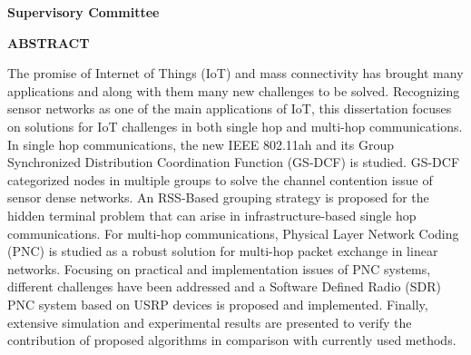 \newpage
{}

\noindent \textbf{Supervisory Committee}
\tpbreak
\panel

\begin{center}
\textbf{ABSTRACT}
\end{center}

The promise of Internet of Things (IoT) and mass connectivity has brought many applications and along with them many new challenges to be solved. Recognizing sensor networks as one of the main applications of IoT, this dissertation focuses on solutions for IoT challenges in both single hop and multi-hop communications. In single hop communications, the new IEEE 802.11ah and its Group Synchronized Distribution Coordination Function (GS-DCF) is studied. GS-DCF categorized nodes in multiple groups to solve the channel contention issue of sensor dense networks. An RSS-Based grouping strategy is proposed for the hidden terminal problem that can arise in infrastructure-based single hop communications. For multi-hop communications, Physical Layer Network Coding (PNC) is studied as a robust solution for multi-hop packet exchange in linear networks. Focusing on practical and implementation issues of PNC systems, different challenges have been addressed and a Software Defined Radio (SDR) PNC system based on USRP devices is proposed and implemented. Finally, extensive simulation and experimental results are presented to verify the contribution of proposed algorithms in comparison with currently used methods.
